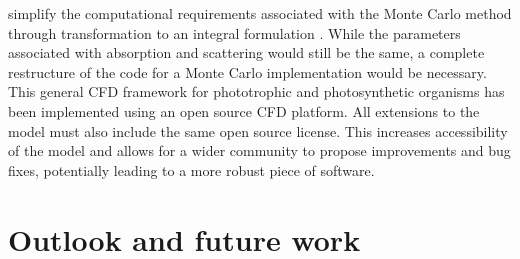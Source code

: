 simplify the computational requirements associated with the Monte Carlo method through transformation to an integral formulation \cite{dauchet2013}. While the parameters associated with absorption and scattering would still be the same, a complete restructure of the code for a Monte Carlo implementation would be necessary.
\skippingparagraph
This general CFD framework for phototrophic and photosynthetic organisms has been implemented using an open source CFD platform. All extensions to the model must also include the same open source license. This increases accessibility of the model and allows for a wider community to propose improvements and bug fixes, potentially leading to a more robust piece of software. 




\section{Outlook and future work}
